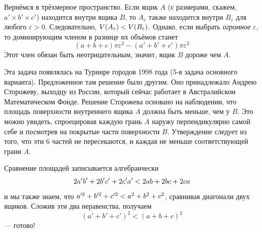 Вернёмся в трёхмерное пространство.
Если ящик $A$ (с размерами, скажем, $a'\times b'\times c'$) находится внутри ящика $B$, то $A_\varepsilon$ также находится внутри $B_\varepsilon$ для любого $\varepsilon > 0$.
Следовательно, $V(A_\varepsilon ) \z< V(B_\varepsilon)$.
Однако, если выбрать \emph{огромное} $\varepsilon$, то доминирующим членом в разнице их объёмов станет
\[(a+b+c)\pi\varepsilon^2-(a'+b'+c')\pi\varepsilon^2\]
Этот член обязан быть неотрицательным, значит, ящик $B$ дороже чем $A$.

Эта задача появлялась на Турнире городов 1998 года (5-я задача основного варианта).
Предложенное там решение было другим.
Оно принадлежало Андрею Сторожеву, выходцу из России, который сейчас работает в Австралийском Математическом Фонде.
Решение Сторожева основано на наблюдении, что площадь поверхности внутреннего ящика $A$ должна быть меньше, чем у  $B$.
Это можно увидеть, спроецировав каждую грань $A$ наружу перпендикулярно самой себе и посмотрев на покрытые части поверхности $B$.
Утверждение следует из того, что эти 6 частей не пересекаются, и каждая не меньше соответствующей грани $A$.

Сравнение площадей записывается алгебраически 
\[2a'b'\z+2b'c'\z+2c'a' \z< 2ab\z+2bc\z+2ca\] 
и мы также знаем, что $a'^2\z+b'^2\z+c'^2\z<a^2\z+b^2\z+c^2$, сравнивая диагонали двух ящиков.
Сложив эти два неравенства, получаем 
\[(a'+b'+c')^2<(a+b+c)^2\]
--- готово!


